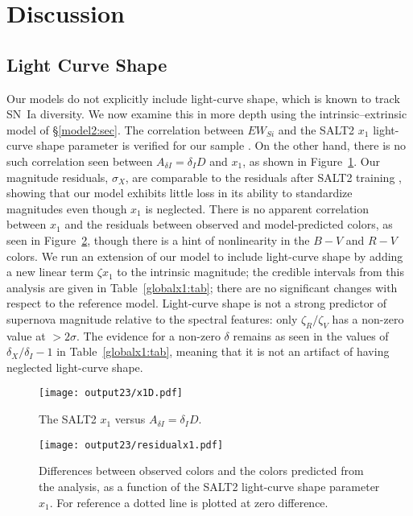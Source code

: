 \documentclass{aastex61}   	%
\begin{document}
\section{Discussion}
\label{discussion:sec}

\subsection{Light Curve Shape}
Our models do not explicitly include light-curve shape, which is known to track SN~Ia diversity.
We now examine this in more depth using the intrinsic--extrinsic model of \S\ref{model2:sec}.
The correlation between $EW_{Si}$ and the SALT2 $x_1$ light-curve shape parameter is verified
for our sample \citep{2017Chotard}.
On the other hand, there is no such correlation seen between $A_{\delta I} = \delta_I D$ and $x_1$, as shown in Figure~\ref{x1:fig}. 
Our magnitude residuals, $\sigma_X$, are comparable to the residuals after SALT2 training
\citep{2010A&A...523A...7G}, showing that our model exhibits little loss in its ability to standardize
magnitudes even though $x_1$ is neglected.
There is no apparent correlation
between $x_1$ and the residuals between observed and model-predicted colors, as seen in
Figure~\ref{x1res:fig},
though there is a hint of nonlinearity in the $B-V$ and $R-V$ colors.
We  run an extension of our model to include light-curve shape by adding a new linear term $\zeta x_1$ to the 
intrinsic magnitude; the credible intervals
from this analysis are given in Table~\ref{globalx1:tab}; there are no significant changes with respect to the reference model. 
Light-curve shape is not a strong predictor of supernova magnitude relative to the spectral features: only $\zeta_R/\zeta_V$
has a non-zero value at $>2\sigma$.
The evidence for a non-zero $\delta$ remains as seen in the values of $\delta_X/\delta_I-1$ in Table~\ref{globalx1:tab}, meaning that it is not an artifact of
having neglected light-curve shape.

\begin{figure}[htbp] %
   \centering
   \texttt{[image: output23/x1D.pdf]}
    \caption{The SALT2 $x_1$ versus $A_{\delta I}  = \delta_I D$.
   \label{x1:fig}}
\end{figure}


\begin{figure}[htbp] %
   \centering
   \texttt{[image: output23/residualx1.pdf]}
    \caption{Differences between observed colors and the colors predicted from the analysis, as a function
            of the SALT2 light-curve shape parameter $x_1$.  For reference a dotted line is plotted at zero difference.
   \label{x1res:fig}}
\end{figure}
\end{document}
